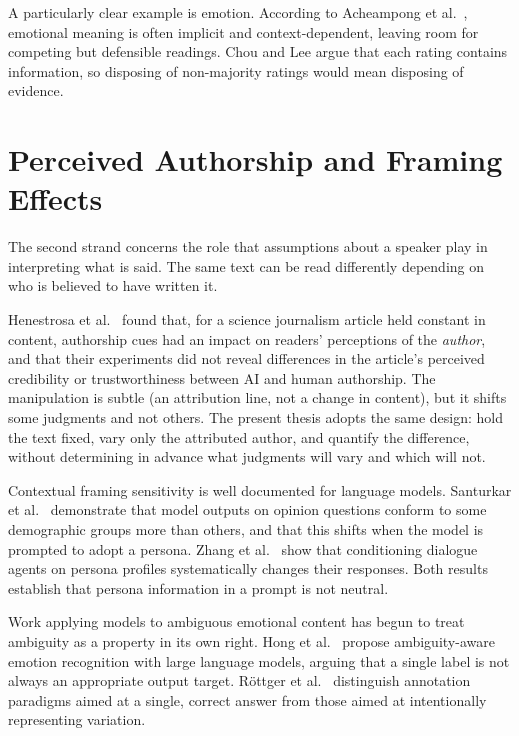 A particularly clear example is emotion. According to Acheampong et al.\
\citeyear{Acheampong2021EmotionReview}, emotional meaning is often implicit and context-dependent,
leaving room for competing but defensible readings. Chou and Lee \citeyear{Chou2019EveryRating}
argue that each rating contains information, so disposing of non-majority ratings would mean
disposing of evidence.

\section{Perceived Authorship and Framing Effects}
\label{lit:framing}

\noindent
The second strand concerns the role that assumptions about a speaker play in interpreting what
is said. The same text can be read differently depending on who is believed to have written
it.

Henestrosa et al.\ \citeyear{Henestrosa2023Authorship} found that, for a science journalism
article held constant in content, authorship cues had an impact on readers' perceptions of the
\emph{author}, and that their experiments did not reveal differences in the article's perceived
credibility or trustworthiness between AI and human authorship. The manipulation is subtle (an
attribution line, not a change in content), but it shifts some judgments and not others. The
present thesis adopts the same design: hold the text fixed, vary only the attributed
author, and quantify the difference, without determining in advance what judgments will vary and
which will not.

Contextual framing sensitivity is well documented for language models. Santurkar et al.\
\citeyear{Santurkar2023WhoseOpinions} demonstrate that model outputs on opinion questions conform
to some demographic groups more than others, and that this shifts when the model is prompted to
adopt a persona. Zhang et al.\ \citeyear{Zhang2018Persona} show that conditioning dialogue
agents on persona profiles systematically changes their responses. Both results establish that
persona information in a prompt is not neutral.

Work applying models to ambiguous emotional content has begun to treat ambiguity as a property in
its own right. Hong et al.\ \citeyear{Hong2024AERLLM} propose ambiguity-aware emotion recognition
with large language models, arguing that a single label is not always an appropriate output
target. R\"ottger et al.\ \citeyear{Rottger2022AnnotationParadigms} distinguish annotation
paradigms aimed at a single, correct answer from those aimed at intentionally representing
variation.

